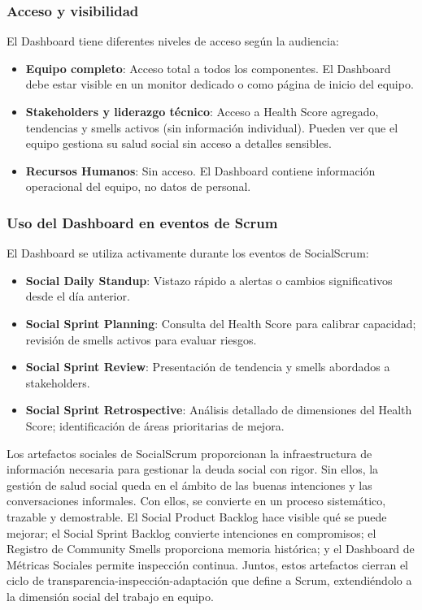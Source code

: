\FloatBarrier

\subsubsection{Acceso y visibilidad}

El Dashboard tiene diferentes niveles de acceso según la audiencia:

\begin{itemize}
    \item \textbf{Equipo completo}: Acceso total a todos los componentes. El Dashboard debe estar visible en un monitor dedicado o como página de inicio del equipo.

    \item \textbf{Stakeholders y liderazgo técnico}: Acceso a Health Score agregado, tendencias y smells activos (sin información individual). Pueden ver que el equipo gestiona su salud social sin acceso a detalles sensibles.

    \item \textbf{Recursos Humanos}: Sin acceso. El Dashboard contiene información operacional del equipo, no datos de personal.
\end{itemize}

\subsubsection{Uso del Dashboard en eventos de Scrum}

El Dashboard se utiliza activamente durante los eventos de SocialScrum:

\begin{itemize}
    \item \textbf{Social Daily Standup}: Vistazo rápido a alertas o cambios significativos desde el día anterior.

    \item \textbf{Social Sprint Planning}: Consulta del Health Score para calibrar capacidad; revisión de smells activos para evaluar riesgos.

    \item \textbf{Social Sprint Review}: Presentación de tendencia y smells abordados a stakeholders.

    \item \textbf{Social Sprint Retrospective}: Análisis detallado de dimensiones del Health Score; identificación de áreas prioritarias de mejora.
\end{itemize}

Los artefactos sociales de SocialScrum proporcionan la infraestructura de información necesaria para gestionar la deuda social con rigor. Sin ellos, la gestión de salud social queda en el ámbito de las buenas intenciones y las conversaciones informales. Con ellos, se convierte en un proceso sistemático, trazable y demostrable. El Social Product Backlog hace visible qué se puede mejorar; el Social Sprint Backlog convierte intenciones en compromisos; el Registro de Community Smells proporciona memoria histórica; y el Dashboard de Métricas Sociales permite inspección continua. Juntos, estos artefactos cierran el ciclo de transparencia-inspección-adaptación que define a Scrum, extendiéndolo a la dimensión social del trabajo en equipo.

